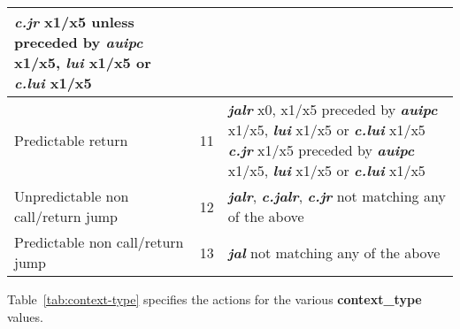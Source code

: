 \begin{table}[htp]
\begin{tabulary}{\textwidth}{|l|l|p{80mm}|}
\textit{\textbf {c.jr}} x1/x5 unless preceded by \textit{\textbf {auipc}} x1/x5, \textit{\textbf {lui}} x1/x5 or \textit{\textbf {c.lui}} x1/x5\\
        \hline
        Predictable return & 11 & \textit{\textbf {jalr}} x0, x1/x5 preceded by \textit{\textbf {auipc}} x1/x5, \textit{\textbf {lui}} x1/x5 or \textit{\textbf {c.lui}} x1/x5\newline
\textit{\textbf {c.jr}} x1/x5 preceded by \textit{\textbf {auipc}} x1/x5, \textit{\textbf {lui}} x1/x5 or \textit{\textbf {c.lui}} x1/x5\\
        \hline
        Unpredictable non call/return jump & 12 & \textit{\textbf {jalr}}, \textit{\textbf {c.jalr}}, \textit{\textbf {c.jr}} not matching any of the above\\
        \hline
        Predictable non call/return jump & 13 & \textit{\textbf {jal}} not matching any of the above\\
        \hline
    \end{tabulary}
\end{table}

Table~\ref{tab:context-type} specifies the actions for the various \textbf{context\_type} values.

